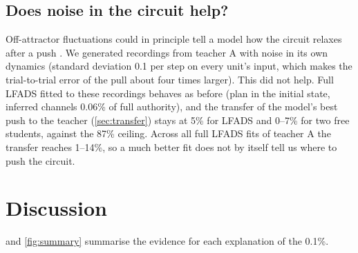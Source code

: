 \documentclass[11pt,a4paper]{article}
\begin{document}
\subsection{Does noise in the circuit help?}\label{sec:res-noise}

Off-attractor fluctuations could in principle tell a model how the circuit relaxes after a push \citep{galgali2023}. We generated recordings from teacher A with noise in its own dynamics (standard deviation 0.1 per step on every unit's input, which makes the trial-to-trial error of the pull about four times larger). This did not help. Full LFADS fitted to these recordings behaves as before (plan in the initial state, inferred channels 0.06\% of full authority), and the transfer of the model's best push to the teacher (\cref{sec:transfer}) stays at 5\% for LFADS and 0--7\% for two free students, against the 87\% ceiling. Across all full LFADS fits of teacher A the transfer reaches 1--14\%, so a much better fit does not by itself tell us where to push the circuit.

\section{Discussion}\label{sec:discussion}

 and \cref{fig:summary} summarise the evidence for each explanation of the 0.1\%.
\end{document}
